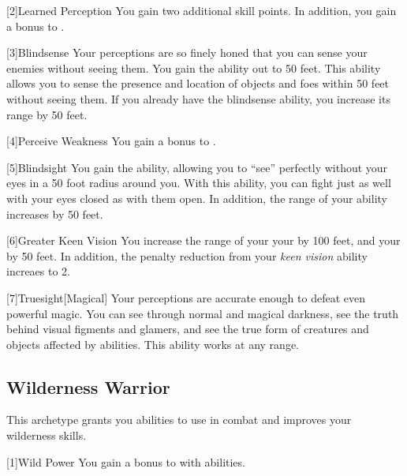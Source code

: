         [2]{Learned Perception} You gain two additional skill points.
        In addition, you gain a  bonus to .

        [3]{Blindsense}
        Your perceptions are so finely honed that you can sense your enemies without seeing them.
        You gain the  ability out to 50 feet.
        This ability allows you to sense the presence and location of objects and foes within 50 feet without seeing them.
        If you already have the blindsense ability, you increase its range by 50 feet.

        [4]{Perceive Weakness}
        You gain a  bonus to .

        [5]{Blindsight}
        You gain the  ability, allowing you to ``see'' perfectly without your eyes in a 50 foot radius around you.
        With this ability, you can fight just as well with your eyes closed as with them open.
        In addition, the range of your  ability increases by 50 feet.

        [6]{Greater Keen Vision}
        You increase the range of your your  by 100 feet, and your  by 50 feet.
        In addition, the penalty reduction from your \textit{keen vision} ability increaes to 2.

        [7]{Truesight}[Magical]
        Your perceptions are accurate enough to defeat even powerful magic.
        You can see through normal and magical darkness, see the truth behind visual figments and glamers, and see the true form of creatures and objects affected by  abilities.
        This ability works at any range.

    \subsection{Wilderness Warrior}
        This archetype grants you abilities to use in combat and improves your wilderness skills.

        [1]{Wild Power} You gain a  bonus to  with  abilities.

